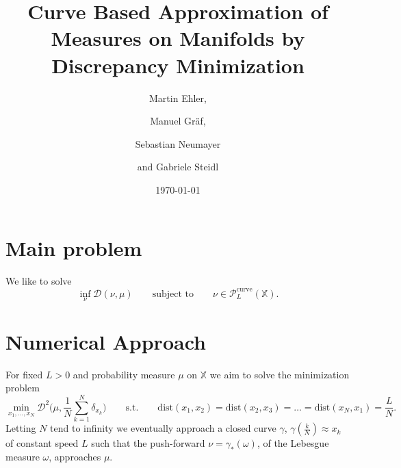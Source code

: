 \documentclass[%
a4paper,11pt,DIV=11,%
abstract=on%
]{scrartcl}
\begin{document}
\title{Curve Based Approximation of Measures on Manifolds by Discrepancy Minimization}

\author{
Martin Ehler\footnotemark[1],
\and
Manuel Gr\"af\footnotemark[2],
\and
Sebastian Neumayer\footnotemark[3]
\and
and Gabriele Steidl\footnotemark[3]
}
\maketitle

\date{\today}



\begin{abstract}
	\noindent\small
	

\end{abstract}

\section{Main problem}

We like to solve
\begin{equation}
  \label{eq:min_PL}
  \inf_{\nu} \mathcal D(\nu,\mu) \qquad \text{subject to} \qquad \nu \in \mathcal P_{L}^{\mathrm{curve}}(\mathbb X). 
\end{equation}


\section{Numerical Approach}

For fixed $L>0$ and probability measure $\mu$ on $\mathbb X$ we aim to solve the minimization problem
\begin{equation}
  \label{eq:constant_speed_min}
  \min_{x_{1},\dots,x_{N}} \mathscr{D}^{2} \Big(\mu, \frac{1}{N} \sum_{k=1}^{N} \delta_{x_{k}}\Big) \qquad \mathrm{s.t.} \qquad    \mathrm{dist}(x_{1},x_{2}) =  \mathrm{dist}(x_{2},x_{3}) = \dots = \mathrm{dist}(x_{N},x_{1}) =  \frac LN.
\end{equation}
Letting $N$ tend to infinity we eventually approach a closed curve $\gamma$, $\gamma(\tfrac kN) \approx x_{k}$ of constant speed $L$ such that the push-forward $\nu = \gamma_{*}(\omega)$, of the Lebesgue measure $\omega$, approaches $\mu$.  
\end{document}
